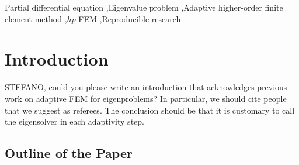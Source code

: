 \documentclass[preprint,12pt]{elsarticle}
\begin{document}
\begin{frontmatter}
\begin{keyword}
Partial differential equation \sep Eigenvalue problem \sep Adaptive higher-order finite element
method \sep $hp$-FEM \sep Reproducible research
\end{keyword}

\end{frontmatter}




\section{Introduction}\label{sec:intro}

{\red STEFANO, could you please write an introduction that acknowledges 
previous work on adaptive FEM for eigenproblems? In particular, we should cite people that we 
suggest as referees. The conclusion should be that it is customary to  
call the eigensolver in each adaptivity step.}

\subsection{Outline of the Paper}
\end{document}
